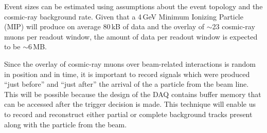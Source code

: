 Event sizes can be estimated using assumptions about the event topology
and the cosmic-ray background rate.  
Given that a 4\,GeV Minimum Ionizing Particle (MIP) will produce on average 80\,kB of data and the overlay of $\sim$23 cosmic-ray muons per readout window,
the amount of data per readout window is expected to be $\sim$6\,MB. 


Since the overlay of cosmic-ray muons over beam-related interactions is random in position and in time,
it is important to record signals which were produced ``just before'' and ``just after'' 
the arrival of the a particle from the beam line.  
This will be possible because the design of the DAQ contains buffer 
memory that can be accessed after the trigger decision is made.  
This technique will enable us to record and reconstruct either partial or complete background tracks present along with the
particle from the beam.





